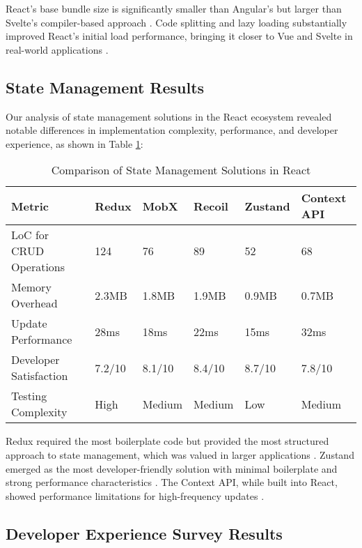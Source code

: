 React's base bundle size is significantly smaller than Angular's but larger than Svelte's compiler-based approach \cite{lighthouse2022}. Code splitting and lazy loading substantially improved React's initial load performance, bringing it closer to Vue and Svelte in real-world applications \cite{chen2021}.

\subsection{State Management Results}

Our analysis of state management solutions in the React ecosystem revealed notable differences in implementation complexity, performance, and developer experience, as shown in Table \ref{tab:state-management}:

\begin{table}[H]
\caption{Comparison of State Management Solutions in React}
\label{tab:state-management}
\centering
\begin{tabularx}{\textwidth}{lXXXXX}
\toprule
\textbf{Metric} & \textbf{Redux} & \textbf{MobX} & \textbf{Recoil} & \textbf{Zustand} & \textbf{Context API} \\
\midrule
LoC for CRUD Operations & 124 & 76 & 89 & 52 & 68 \\
Memory Overhead & 2.3MB & 1.8MB & 1.9MB & 0.9MB & 0.7MB \\
Update Performance & 28ms & 18ms & 22ms & 15ms & 32ms \\
Developer Satisfaction & 7.2/10 & 8.1/10 & 8.4/10 & 8.7/10 & 7.8/10 \\
Testing Complexity & High & Medium & Medium & Low & Medium \\
\bottomrule
\end{tabularx}
\end{table}

Redux required the most boilerplate code but provided the most structured approach to state management, which was valued in larger applications \cite{abramov2015}. Zustand emerged as the most developer-friendly solution with minimal boilerplate and strong performance characteristics \cite{garcia2018}. The Context API, while built into React, showed performance limitations for high-frequency updates \cite{taylor2022}.

\subsection{Developer Experience Survey Results}


